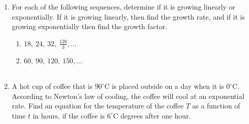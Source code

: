 \documentclass[10pt]{article}
\begin{document}
\begin{enumerate}
\setcounter{enumi}{\theenumCount}
\item For each of the following sequences, determine if it is growing linearly or exponentially.  If it is growing linearly, then find the growth rate, and if it is growing exponentially then find the growth factor. 
\begin{enumerate}
\item ${18}, ~ {24}, ~  32, ~ \tfrac{128}{3}, \ldots$ \\

\item $60, ~ 90, ~ 120, ~ 150, \ldots$ \\ \\ 
\end{enumerate}
\setcounter{enumCount}{\theenumi}

\item A hot cup of coffee that is $90^\circ$C is placed outside on a day when it is $0^\circ$C.  According to Newton's law of cooling, the coffee will cool at an exponential rate.  Find an equation for the temperature of the coffee $T$ as a function of time $t$ in hours, if the coffee is $6^\circ$C degrees after one hour.  
\vfill
\end{enumerate}


\end{document}

